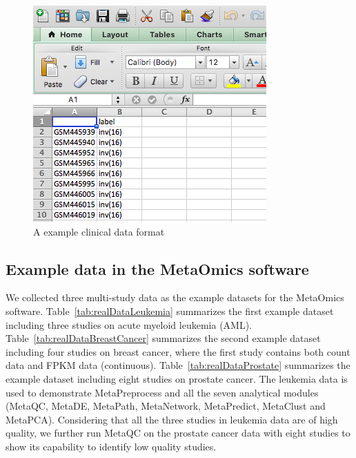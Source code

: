 \begin{figure}[H]
\begin{center}
\includegraphics[scale=0.5]{./figure/dataPreparation/clinicalData}
\caption{A example clinical data format}
\label{fig:clinical}
\end{center}
\end{figure}

\subsection{Example data in the MetaOmics software}


We collected three multi-study data as the example datasets for the MetaOmics software.
Table~\ref{tab:realDataLeukemia} summarizes the first example dataset including three studies on acute myeloid leukemia (AML).
Table~\ref{tab:realDataBreastCancer} summarizes the second example dataset including four studies on breast cancer, where the first study contains both count data and FPKM data (continuous).
Table~\ref{tab:realDataProstate} summarizes the example dataset including eight studies on prostate cancer.
The leukemia data is used to demonstrate MetaPreprocess and all the seven analytical modules (MetaQC, MetaDE, MetaPath, MetaNetwork, MetaPredict, MetaClust and MetaPCA). 
Considering that all the three studies in leukemia data are of high quality, we further run MetaQC on the prostate cancer data with eight studies to show its capability to identify low quality studies. 


